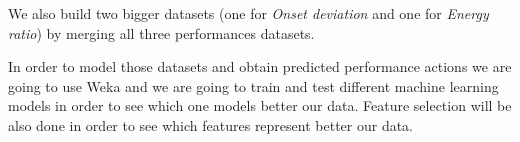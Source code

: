 We also build two bigger datasets (one for \textit{Onset deviation} and one for \textit{Energy ratio}) by merging all three performances datasets. 

In order to model those datasets and obtain predicted performance actions we are going to use Weka and we are going to train and test different machine learning models in order to see which one models better our data. Feature selection will be also done in order to see which features represent better our data.
\cleardoublepage

